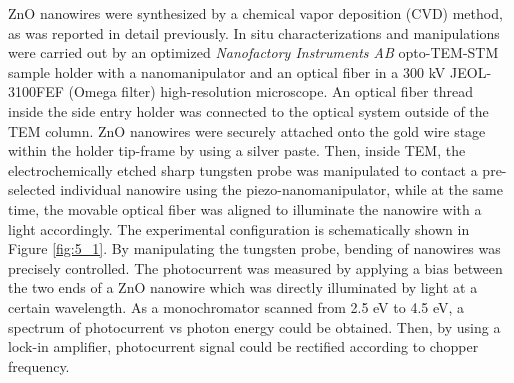 ZnO nanowires were synthesized by a chemical vapor deposition (CVD) method, as was reported in detail previously.\cite{D.2015} In situ characterizations and manipulations were carried out by an optimized {\em Nanofactory Instruments AB} opto-TEM-STM sample holder with a nanomanipulator and an optical fiber in a 300 kV JEOL-3100FEF (Omega filter) high-resolution microscope. An optical fiber thread inside the side entry holder was connected to the optical system outside of the TEM column. ZnO nanowires were securely attached onto the gold wire stage within the holder tip-frame by using a silver paste. Then, inside TEM, the electrochemically etched sharp tungsten probe was manipulated to contact a pre-selected individual nanowire using the piezo-nanomanipulator, while at the same time, the movable optical fiber was aligned to illuminate the nanowire with a light accordingly. The experimental configuration is schematically shown in Figure \ref{fig:5_1}. By manipulating the tungsten probe, bending of nanowires was precisely controlled. The photocurrent was measured by applying a bias between the two ends of a ZnO nanowire which was directly illuminated by light at a certain wavelength. As a monochromator scanned from 2.5 eV to 4.5 eV, a spectrum of photocurrent vs photon energy could be obtained. Then, by using a lock-in amplifier, photocurrent signal could be rectified according to chopper frequency. 

